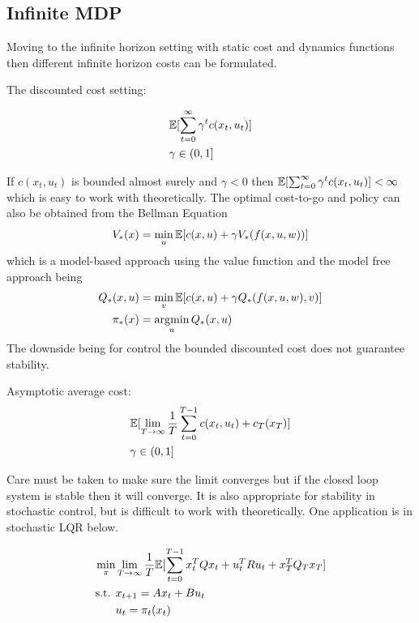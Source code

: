\documentclass{article}[12pt]
\begin{document}
\subsection{Infinite MDP}
Moving to the infinite horizon setting with static cost and dynamics functions then different infinite horizon costs can be formulated.

The discounted cost setting:

\begin{equation}
\begin{split}
    &\mathbb{E}[\sum_{t=0}^{\infty} \gamma^t c(x_t,u_t)] \\
    &\gamma \in \left(0,1\right]
\end{split}
\end{equation}

If $c(x_t,u_t)$ is bounded almost surely and $\gamma < 0$ then $\mathbb{E}[\sum_{t=0}^{\infty} \gamma^t c(x_t,u_t)] < \infty$ which is easy to work with theoretically. The optimal cost-to-go and policy can also be obtained from the Bellman Equation
\begin{equation}
    V_*(x) = \min_u \mathbb{E}[c(x,u) + \gamma V_*(f(x,u,w))]
\end{equation}
which is a model-based approach using the value function and the model free approach being 
\begin{equation}
\begin{split}
    Q_*(x,u) &= \min_v \mathbb{E}[c(x,u) + \gamma Q_*(f(x,u,w),v)] \\
    \pi_*(x) &= \operatorname*{arg\!\min}_u Q_*(x,u)
\end{split}
\end{equation}
The downside being for control the bounded discounted cost does not guarantee stability.

Asymptotic average cost:
\begin{equation}
\begin{split}
    &\mathbb{E}[\lim_{T\rightarrow \infty} \frac{1}{T}\sum_{t=0}^{T-1} c(x_t,u_t) + c_T(x_T)] \\
    &\gamma \in \left(0,1\right]
\end{split}
\end{equation}

Care must be taken to make sure the limit converges but if the closed loop system is stable then it will converge. It is also appropriate for stability in stochastic control, but is difficult to work with theoretically. One application is in stochastic LQR below.

\begin{equation}
\begin{split}
   \min_\pi & \lim_{T \rightarrow \infty} \frac{1}{T}\mathbb{E} [\sum_{t=0}^{T-1} x_t^TQx_t + u_t^TRu_t + x_T^TQ_Tx_T ] \\
   \mbox{s.t. } & x_{t+1} = Ax_t + Bu_t \\
   & u_t = \pi_t(x_{t})
\end{split}
\end{equation}
\end{document}
